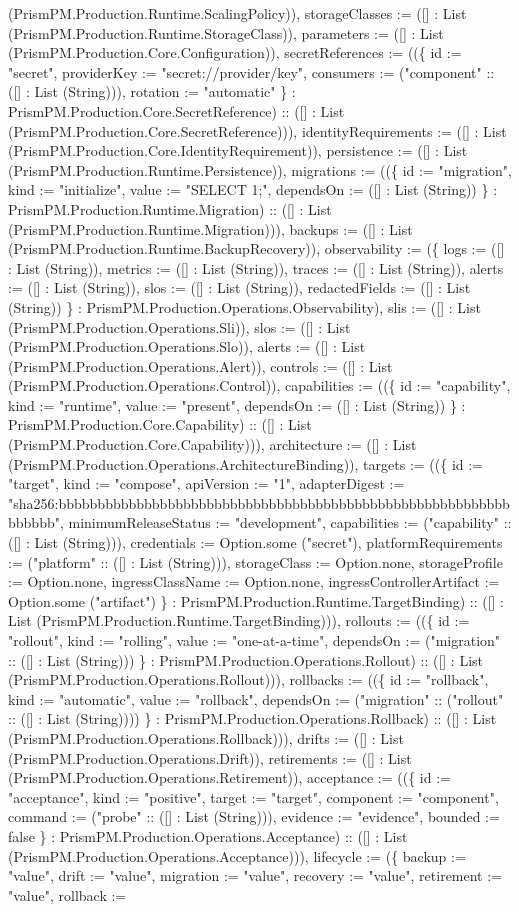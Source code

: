 \documentclass[11pt]{article}
\begin{document}
(PrismPM.Production.Runtime.ScalingPolicy)), storageClasses := ([] : List (PrismPM.Production.Runtime.StorageClass)), parameters := ([] : List (PrismPM.Production.Core.Configuration)), secretReferences := ((\{ id := "secret", providerKey := "secret://provider/key", consumers := ("component" :: ([] : List (String))), rotation := "automatic" \} : PrismPM.Production.Core.SecretReference) :: ([] : List (PrismPM.Production.Core.SecretReference))), identityRequirements := ([] : List (PrismPM.Production.Core.IdentityRequirement)), persistence := ([] : List (PrismPM.Production.Runtime.Persistence)), migrations := ((\{ id := "migration", kind := "initialize", value := "SELECT 1;", dependsOn := ([] : List (String)) \} : PrismPM.Production.Runtime.Migration) :: ([] : List (PrismPM.Production.Runtime.Migration))), backups := ([] : List (PrismPM.Production.Runtime.BackupRecovery)), observability := (\{ logs := ([] : List (String)), metrics := ([] : List (String)), traces := ([] : List (String)), alerts := ([] : List (String)), slos := ([] : List (String)), redactedFields := ([] : List (String)) \} : PrismPM.Production.Operations.Observability), slis := ([] : List (PrismPM.Production.Operations.Sli)), slos := ([] : List (PrismPM.Production.Operations.Slo)), alerts := ([] : List (PrismPM.Production.Operations.Alert)), controls := ([] : List (PrismPM.Production.Operations.Control)), capabilities := ((\{ id := "capability", kind := "runtime", value := "present", dependsOn := ([] : List (String)) \} : PrismPM.Production.Core.Capability) :: ([] : List (PrismPM.Production.Core.Capability))), architecture := ([] : List (PrismPM.Production.Operations.ArchitectureBinding)), targets := ((\{ id := "target", kind := "compose", apiVersion := "1", adapterDigest := "sha256:bbbbbbbbbbbbbbbbbbbbbbbbbbbbbbbbbbbbbbbbbbbbbbbbbbbbbbbbbbbbbbbb", minimumReleaseStatus := "development", capabilities := ("capability" :: ([] : List (String))), credentials := Option.some ("secret"), platformRequirements := ("platform" :: ([] : List (String))), storageClass := Option.none, storageProfile := Option.none, ingressClassName := Option.none, ingressControllerArtifact := Option.some ("artifact") \} : PrismPM.Production.Runtime.TargetBinding) :: ([] : List (PrismPM.Production.Runtime.TargetBinding))), rollouts := ((\{ id := "rollout", kind := "rolling", value := "one-at-a-time", dependsOn := ("migration" :: ([] : List (String))) \} : PrismPM.Production.Operations.Rollout) :: ([] : List (PrismPM.Production.Operations.Rollout))), rollbacks := ((\{ id := "rollback", kind := "automatic", value := "rollback", dependsOn := ("migration" :: ("rollout" :: ([] : List (String)))) \} : PrismPM.Production.Operations.Rollback) :: ([] : List (PrismPM.Production.Operations.Rollback))), drifts := ([] : List (PrismPM.Production.Operations.Drift)), retirements := ([] : List (PrismPM.Production.Operations.Retirement)), acceptance := ((\{ id := "acceptance", kind := "positive", target := "target", component := "component", command := ("probe" :: ([] : List (String))), evidence := "evidence", bounded := false \} : PrismPM.Production.Operations.Acceptance) :: ([] : List (PrismPM.Production.Operations.Acceptance))), lifecycle := (\{ backup := "value", drift := "value", migration := "value", recovery := "value", retirement := "value", rollback := 
\end{document}
